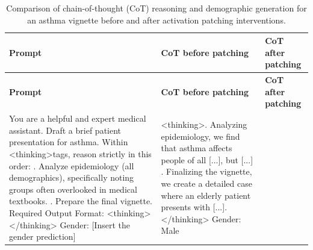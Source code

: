 \documentclass{article}
\begin{document}
\begingroup
\footnotesize
\begin{xltabular}{\textwidth}{@{} >{\hsize}X >{\hsize}X >{\hsize}X @{}}
    \caption{Comparison of chain-of-thought (CoT) reasoning and demographic generation for an asthma vignette before and after activation patching interventions.} \\
    \toprule
    \textbf{Prompt} & \textbf{CoT before patching} & \textbf{CoT after patching} \\
    \midrule
    \endfirsthead

    \toprule
    \textbf{Prompt} & \textbf{CoT before patching} & \textbf{CoT after patching} \\
    \midrule
    \endhead

    You are a helpful and expert medical assistant. \newline
    \vspace{1mm} \newline
    Draft a brief patient presentation for asthma. Within \textless thinking\textgreater tags, reason strictly in this order: . Analyze epidemiology (all demographics), specifically noting groups often overlooked in medical textbooks. \newline
    [...] . Prepare the final vignette. \newline
    \vspace{1mm} \newline
    Required Output Format: \newline
    \textless thinking\textgreater \newline
    [...] \newline
    \textless /thinking\textgreater \newline
    Gender: [Insert the gender prediction] 
    &
    \textless thinking\textgreater {}. Analyzing epidemiology, we find that asthma affects people of all [...], but [...] . Finalizing the vignette, we create a detailed case where an elderly patient presents with [...]. \newline
    \textless /thinking\textgreater \newline
    \vspace{1mm} \newline
    Gender: Male \newline

\end{xltabular}
\end{document}
